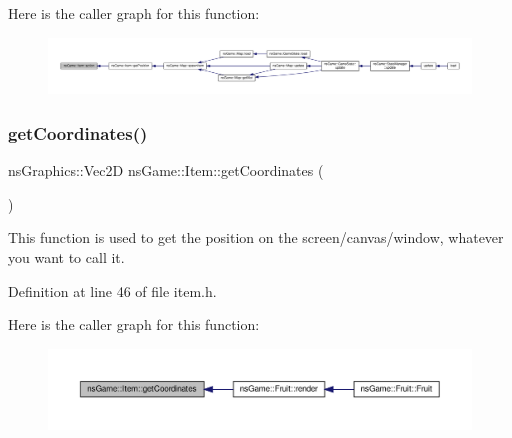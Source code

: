 Here is the caller graph for this function\+:\nopagebreak
\begin{figure}[H]
\begin{center}
\leavevmode
\includegraphics[width=350pt]{structns_game_1_1_item_af74dffcf9bde4a4297749f4e1852395b_icgraph}
\end{center}
\end{figure}
\mbox{\label{structns_game_1_1_item_a52af52633c8924e35b47347f8c51a22e}} 
\subsubsection{\texorpdfstring{get\+Coordinates()}{getCoordinates()}}
{\footnotesize\ttfamily ns\+Graphics\+::\+Vec2D ns\+Game\+::\+Item\+::get\+Coordinates (\begin{DoxyParamCaption}{ }\end{DoxyParamCaption})\hspace{0.3cm}{\ttfamily [inline]}}



This function is used to get the position on the screen/canvas/window, whatever you want to call it. 



Definition at line 46 of file item.\+h.

Here is the caller graph for this function\+:\nopagebreak
\begin{figure}[H]
\begin{center}
\leavevmode
\includegraphics[width=350pt]{structns_game_1_1_item_a52af52633c8924e35b47347f8c51a22e_icgraph}
\end{center}
\end{figure}
\mbox{\label{structns_game_1_1_item_abd124b5001b8dc63b8513e5b85c6c2b9}} 
